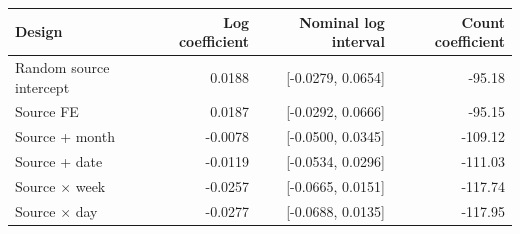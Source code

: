 \begin{tabular}{lrrr}
\toprule
Design & Log coefficient & Nominal log interval & Count coefficient \\
\midrule
Random source intercept & 0.0188 & [-0.0279, 0.0654] & -95.18 \\
Source FE & 0.0187 & [-0.0292, 0.0666] & -95.15 \\
Source + month & -0.0078 & [-0.0500, 0.0345] & -109.12 \\
Source + date & -0.0119 & [-0.0534, 0.0296] & -111.03 \\
Source $\times$ week & -0.0257 & [-0.0665, 0.0151] & -117.74 \\
Source $\times$ day & -0.0277 & [-0.0688, 0.0135] & -117.95 \\
\bottomrule
\end{tabular}
